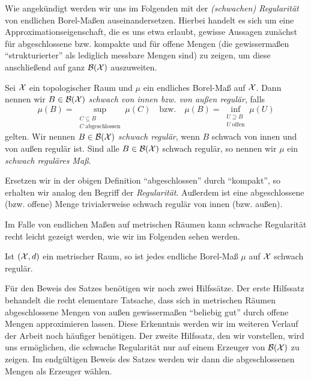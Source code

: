 \documentclass[../thesis/thesis.tex]{subfiles}
\begin{document}
	Wie angekündigt werden wir uns im Folgenden mit der \emph{(schwachen) Regularität} von endlichen Borel-Maßen auseinandersetzen. 
	Hierbei handelt es sich um eine Approximationseigenschaft, die es uns etwa erlaubt, gewisse Aussagen 
	zunächst für abgeschlossene bzw. kompakte und für offene Mengen (die gewissermaßen \enquote{strukturierter} als lediglich messbare Mengen sind) zu zeigen, 
	um diese anschließend auf ganz $\mathcal{B}(\mathcal{X})$ auszuweiten. 
	
	\begin{Definition}
		\label{def:schwache_regularität}
		Sei $\mathcal{X}$ ein topologischer Raum und $\mu$ ein endliches Borel-Maß auf $\mathcal{X}$. 
		Dann nennen wir $B \in \mathcal{B}(\mathcal{X})$ \emph{schwach von 
			innen bzw. von außen regulär}, falls
		$$\mu(B) = \sup_{\substack{C \subseteq B \\ C \; \text{abgeschlossen}}} \mu(C) 
		\quad \text{bzw.} \quad \mu(B) = \inf_{\substack{U \supseteq B \\ U \; \text{offen}}} 
		\mu(U)$$
		gelten. Wir nennen $B \in \mathcal{B}(\mathcal{X})$ \emph{schwach regulär}, wenn $B$ schwach von innen und 
		von außen regulär ist. Sind alle $B \in \mathcal{B}(\mathcal{X})$ schwach regulär, 
		so nennen wir $\mu$ ein \emph{schwach reguläres Maß}.
	\end{Definition}
	
	\begin{Bemerkung}
		Ersetzen wir in der obigen Definition \enquote{abgeschlossen} durch \enquote{kompakt}, 
		so erhalten wir analog den Begriff der \emph{Regularität}. 
		Außerdem ist eine abgeschlossene (bzw. offene) Menge trivialerweise schwach regulär von innen (bzw. außen).
	\end{Bemerkung}
	
	Im Falle von endlichen Maßen auf metrischen Räumen kann schwache Regularität 
	recht leicht gezeigt werden, wie wir im Folgenden sehen werden.
	
	\begin{Satz}
		\label{satz:schwache_regularität}
		Ist $(\mathcal{X}, d)$ ein metrischer Raum, so ist jedes endliche Borel-Maß $\mu$ auf $\mathcal{X}$ schwach regulär.
	\end{Satz}
	
	Für den Beweis des Satzes benötigen wir noch zwei Hilfssätze. 
	Der erste Hilfssatz behandelt die recht elementare Tatsache, dass sich in metrischen Räumen 
	abgeschlossene Mengen von außen gewissermaßen \enquote{beliebig gut} durch offene Mengen approximieren lassen. 
	Diese Erkenntnis werden wir im weiteren Verlauf der Arbeit noch häufiger benötigen.
	Der zweite Hilfssatz, den wir vorstellen,
	wird uns ermöglichen, die schwache Regularität nur auf einem Erzeuger von $\mathcal{B}(\mathcal{X})$ 
	zu zeigen. Im endgültigen Beweis des Satzes werden wir dann die abgeschlossenen Mengen als Erzeuger wählen.
	
\end{document}
